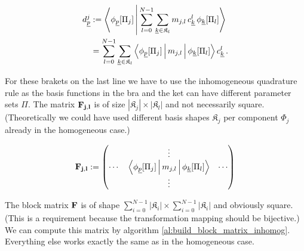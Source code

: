 \begin{align*}
  d_{\underline{p}}^j & := \Braket{ \phi_{\underline{p}}[\Pi_j] | \sum_{l=0}^{N-1} \sum_{\underline{k}\in\mathfrak{K}_l} m_{j,l} \, c_{\underline{k}}^l \, \phi_{\underline{k}}[\Pi_l] } \\
                & = \sum_{l=0}^{N-1} \sum_{\underline{k}\in\mathfrak{K}_l}
                    \Braket{\phi_{\underline{p}}[\Pi_j] | m_{j,l} | \phi_{\underline{k}}[\Pi_l]} c_{\underline{k}}^l \,.
\end{align*}

For these brakets on the last line we have to use the inhomogeneous quadrature
rule as the basis functions in the bra and the ket can have different parameter
sets $\Pi$. The matrix $\mathbf{F_{j,l}}$ is of size $|\mathfrak{K}_j| \times |\mathfrak{K}_l|$
and not necessarily square. (Theoretically we could have used different basis shapes
$\mathfrak{K}_j$ per component $\Phi_j$ already in the homogeneous case.)

\begin{equation*}
  \mathbf{F_{j,l}} :=
  \begin{pmatrix}
    {}     & \vdots                                                           & {} \\
    \cdots & \Braket{\phi_{\underline{p}}[\Pi_j] | m_{j,l} | \phi_{\underline{k}}[\Pi_l]} & \cdots \\
    {}     & \vdots                                                           & {}
  \end{pmatrix}
\end{equation*}

The block matrix $\mathbf{F}$ is of shape $\sum_{i=0}^{N-1} |\mathfrak{K}_i| \times \sum_{i=0}^{N-1} |\mathfrak{K}_i|$
and obviously square. (This is a requirement because the transformation mapping
should be bijective.) We can compute this matrix by algorithm \ref{al:build_block_matrix_inhomog}.
Everything else works exactly the same as in the homogeneous case.
